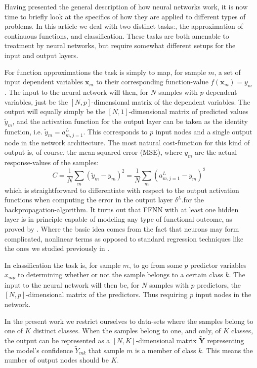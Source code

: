 \documentclass[reprint, english, nofootinbib]{revtex4-2}
\begin{document}
Having presented the general description of how neural networks work, it is now time to briefly look at the specifics of how they are applied to different types of problems. In this article we deal with two distinct tasks:, the approximation of continuous functions, and classification. These tasks are both amenable to treatment by neural networks, but require somewhat different setups for the input and output layers.

For function approximations the task is simply to map, for sample $m$,  a set of input dependent variables $\mathbf{x}_m$ to their corresponding function-value $f(\mathbf{x}_m) = y_m$. The input to the neural network will then, for $N$ samples with $p$ dependent variables, just be the $[N,p]$-dimensional matrix of the dependent variables. The output will equally simply be the $[N,1]$-dimensional matrix of predicted values $\tilde{y}_m$, and the activation function for the output layer can be taken as the identity function, i.e. $\tilde{y}_m = a^L_{m,j=1}$. This corresponds to $p$ input nodes and a single output node in the network architecture. The most natural cost-function for this kind of output is, of course, the mean-squared error (MSE), where $y_m$ are the actual response-values of the samples:
\begin{equation}
\label{eq:cost_mse}
C = \frac{1}{N} \sum_m (\tilde{y}_m - y_m)^2 = \frac{1}{N} \sum_m (a^L_{m,j=1} - y_m)^2
\end{equation}
which is straightforward to differentiate with respect to the output activation functions when computing the error in the output layer $\delta^L$.for the backpropagation-algorithm. It turns out that FFNN with at least one hidden layer is in principle capable of modeling any type of functional outcome, as proved by \textcite{HORNIK1989359}. Where the basic idea comes from the fact that neurons may form complicated, nonlinear terms as opposed to standard regression techniques like the ones we studied previously in \cite{4155_project_1}.

In classification the task is, for sample $m$, to go from some $p$ predictor variables $x_{mp}$ to determining whether or not the sample belongs to a certain class $k$. The input to the neural network will then be, for $N$ samples with $p$ predictors, the $[N,p]$-dimensional matrix of the predictors. Thus requiring $p$ input nodes in the network.

In the present work we restrict ourselves to data-sets where the samples belong to one of $K$ distinct classes. When the samples belong to one, and only, of $K$ classes, the output can be represented as a $[N,K]$-dimensional matrix $\mathbf{\tilde{Y}}$ representing the model's confidence $\tilde{Y}_{mk}$ that sample $m$ is a member of class $k$. This means the number of output nodes should be $K$.
\end{document}
